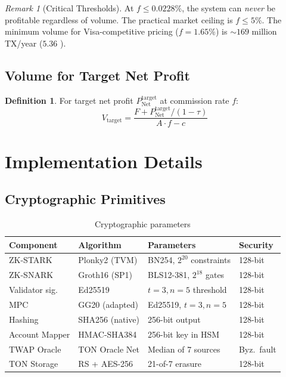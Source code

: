 \documentclass[12pt,a4paper]{article}
\theoremstyle{definition}
\newtheorem{definition}{Definition}[section]
\theoremstyle{remark}
\newtheorem{remark}{Remark}[section]
\newcommand{\TPS}{\text{TPS}}
\begin{document}
\begin{remark}[Critical Thresholds]
At $f \leq 0.0228\%$, the system can \emph{never} be profitable regardless of volume. The practical market ceiling is $f \leq 5\%$. The minimum volume for Visa-competitive pricing ($f = 1.65\%$) is ${\sim}169$ million TX/year ($5.36$ \TPS{}).
\end{remark}

\subsection{Volume for Target Net Profit}

\begin{definition}
For target net profit $P_{\text{Net}}^{\text{target}}$ at commission rate $f$:
\begin{equation}
V_{\text{target}} = \frac{F + P_{\text{Net}}^{\text{target}} / (1 - \tau)}{A \cdot f - c}
\end{equation}
\end{definition}


\section{Implementation Details}
\label{sec:implementation}

\subsection{Cryptographic Primitives}

\begin{table}[H]
\centering
\small
\caption{Cryptographic parameters}
\label{tab:crypto-params}
\begin{tabular}{L{2.5cm}L{3cm}L{3.5cm}R{1.5cm}}
\toprule
\textbf{Component} & \textbf{Algorithm} & \textbf{Parameters} & \textbf{Security} \\
\midrule
ZK-STARK & Plonky2 (TVM) & BN254, $2^{20}$ constraints & 128-bit \\
ZK-SNARK & Groth16 (SP1) & BLS12-381, $2^{18}$ gates & 128-bit \\
Validator sig. & Ed25519 & $t=3, n=5$ threshold & 128-bit \\
MPC & GG20 (adapted) & Ed25519, $t=3, n=5$ & 128-bit \\
Hashing & SHA256 (native) & 256-bit output & 128-bit \\
Account Mapper & HMAC-SHA384 & 256-bit key in HSM & 128-bit \\
TWAP Oracle & TON Oracle Net & Median of 7 sources & Byz.\ fault \\
TON Storage & RS + AES-256 & 21-of-7 erasure & 128-bit \\
\bottomrule
\end{tabular}
\end{table}
\end{document}
